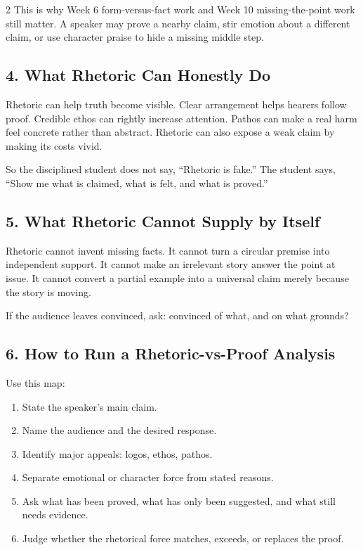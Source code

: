 \documentclass[12pt]{article}
\begin{document}
\begin{multicols}{2}
This is why Week 6 form-versus-fact work and Week 10 missing-the-point work still matter. A speaker may prove a nearby claim, stir emotion about a different claim, or use character praise to hide a missing middle step.

\subsection*{4. What Rhetoric Can Honestly Do}
Rhetoric can help truth become visible. Clear arrangement helps hearers follow proof. Credible ethos can rightly increase attention. Pathos can make a real harm feel concrete rather than abstract. Rhetoric can also expose a weak claim by making its costs vivid.

So the disciplined student does not say, ``Rhetoric is fake.'' The student says, ``Show me what is claimed, what is felt, and what is proved.''

\subsection*{5. What Rhetoric Cannot Supply by Itself}
Rhetoric cannot invent missing facts. It cannot turn a circular premise into independent support. It cannot make an irrelevant story answer the point at issue. It cannot convert a partial example into a universal claim merely because the story is moving.

If the audience leaves convinced, ask: convinced of what, and on what grounds?

\subsection*{6. How to Run a Rhetoric-vs-Proof Analysis}
Use this map:

\begin{enumerate}[leftmargin=*,itemsep=0.12em]
\item State the speaker's main claim.
\item Name the audience and the desired response.
\item Identify major appeals: logos, ethos, pathos.
\item Separate emotional or character force from stated reasons.
\item Ask what has been proved, what has only been suggested, and what still needs evidence.
\item Judge whether the rhetorical force matches, exceeds, or replaces the proof.
\end{enumerate}


\end{multicols}
\end{document}
